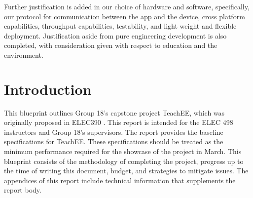 \documentclass[letterpaper,12pt]{article}
\begin{document}
Further justification is added in our choice of hardware and software,
specifically, our protocol for communication between the app and the device,
cross platform capabilities, throughput capabilities, testability, and light weight and
flexible deployment.  Justification aside from pure
engineering development is also completed, with consideration given with respect
to education and the environment.

\tableofcontents
\listoffigures
\listoftables
\newpage
{}
\section{Introduction} \label{sec:intro} %
This blueprint outlines Group 18's capstone project TeachEE, which was
originally proposed in ELEC390 \cite{prop_390}. This report is intended for the
ELEC 498 instructors and Group 18's supervisors. The report provides the
baseline specifications for TeachEE. These specifications should be treated as
the minimum performance required for the showcase of the project in March. This
blueprint consists of the methodology of completing the project, progress up to
the time of writing this document, budget, and strategies to mitigate issues.
The appendices of this report include technical information that supplements the
report body.

\end{document}
